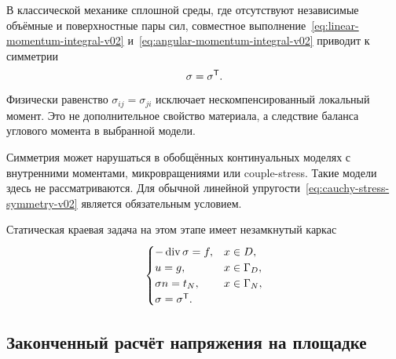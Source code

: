 В классической механике сплошной среды, где отсутствуют независимые объёмные и поверхностные пары сил, совместное выполнение~\eqref{eq:linear-momentum-integral-v02} и~\eqref{eq:angular-momentum-integral-v02} приводит к симметрии
\begin{equation}
\label{eq:cauchy-stress-symmetry-v02}
\sigma=\sigma^{\mathsf{T}}.
\end{equation}
Физически равенство $\sigma_{ij}=\sigma_{ji}$ исключает нескомпенсированный локальный момент. Это не дополнительное свойство материала, а следствие баланса углового момента в выбранной модели.

Симметрия может нарушаться в обобщённых континуальных моделях с внутренними моментами, микровращениями или couple-stress. Такие модели здесь не рассматриваются. Для обычной линейной упругости~\eqref{eq:cauchy-stress-symmetry-v02} является обязательным условием.

Статическая краевая задача на этом этапе имеет незамкнутый каркас
\begin{equation}
\label{eq:stress-equilibrium-boundary-v02}
\begin{cases}
-\operatorname{div}\sigma=f,&x\in D,\\
u=g,&x\in\Gamma_D,\\
\sigma n=t_N,&x\in\Gamma_N,\\
\sigma=\sigma^{\mathsf{T}}.&
\end{cases}
\end{equation}
\subsection{Законченный расчёт напряжения на площадке}
\label{subsec:traction-computation-v02}

